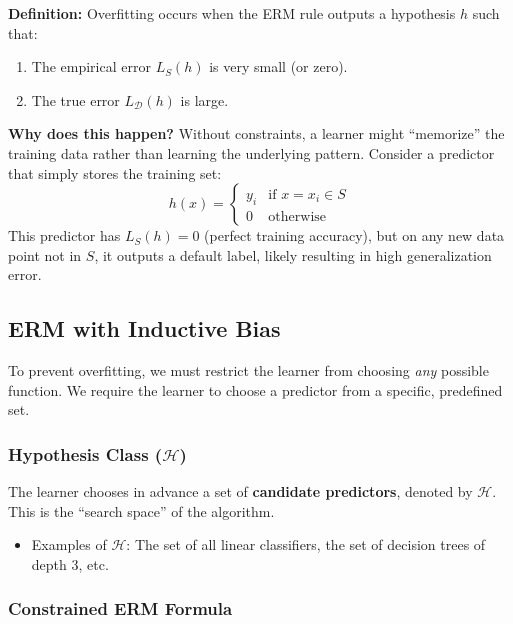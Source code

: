 \documentclass[
  italian,
  11pt,
]{article}
\providecommand{\tightlist}{%
  \setlength{\itemsep}{0pt}\setlength{\parskip}{0pt}}
\begin{document}
\textbf{Definition:} Overfitting occurs when the ERM rule outputs a
hypothesis \(h\) such that:

\begin{enumerate}
\def\labelenumi{\arabic{enumi}.}
\tightlist
\item
  The empirical error \(L_S(h)\) is very small (or zero).
\item
  The true error \(L_{\mathcal{D}}(h)\) is large.
\end{enumerate}

\textbf{Why does this happen?} Without constraints, a learner might
``memorize'' the training data rather than learning the underlying
pattern. Consider a predictor that simply stores the training set:
\[ h(x) = \begin{cases} y_i & \text{if } x = x_i \in S \\ 0 & \text{otherwise} \end{cases} \]
This predictor has \(L_S(h) = 0\) (perfect training accuracy), but on
any new data point not in \(S\), it outputs a default label, likely
resulting in high generalization error.

\subsection{ERM with Inductive Bias}\label{erm-with-inductive-bias}

To prevent overfitting, we must restrict the learner from choosing
\emph{any} possible function. We require the learner to choose a
predictor from a specific, predefined set.

\subsubsection{\texorpdfstring{Hypothesis Class
(\(\mathcal{H}\))}{Hypothesis Class (\textbackslash mathcal\{H\})}}\label{hypothesis-class-mathcalh}

The learner chooses in advance a set of \textbf{candidate predictors},
denoted by \(\mathcal{H}\). This is the ``search space'' of the
algorithm.

\begin{itemize}
\tightlist
\item
  Examples of \(\mathcal{H}\): The set of all linear classifiers, the
  set of decision trees of depth 3, etc.
\end{itemize}

\subsubsection{Constrained ERM Formula}\label{constrained-erm-formula}
\end{document}
